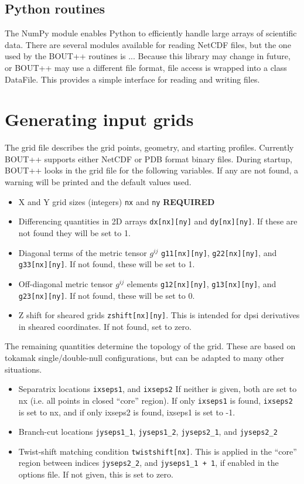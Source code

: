 \documentclass[12pt]{article}
\newcommand{\code}[1]{\texttt{#1}}
\begin{document}
\subsection{Python routines}
The NumPy module enables Python to efficiently handle large arrays of 
scientific data. There are several modules available for reading
NetCDF files, but the one used by the BOUT++ routines is ...
Because this library may change in future, or BOUT++ may use a different
file format, file access is wrapped into a class DataFile. This
provides a simple interface for reading and writing files.

\section{Generating input grids}
\label{sec:gridgen}

The grid file describes the grid points, geometry, and starting profiles.
Currently BOUT++ supports either NetCDF or PDB format binary files.
During startup, BOUT++ looks in the grid file for the following variables.
If any are not found, a warning will be printed and the default values used.
\begin{itemize}
\item X and Y grid sizes (integers) \code{nx} and \code{ny} {\bf REQUIRED}
\item Differencing quantities in 2D arrays \code{dx[nx][ny]} and \code{dy[nx][ny]}.
  If these are not found they will be set to 1.
\item Diagonal terms of the metric tensor $g^{ij}$ \code{g11[nx][ny]}, \code{g22[nx][ny]},
  and \code{g33[nx][ny]}. If not found, these will be set to 1. 
\item Off-diagonal metric tensor $g^{ij}$ elements \code{g12[nx][ny]}, \code{g13[nx][ny]},
  and \code{g23[nx][ny]}. If not found, these will be set to 0.
\item Z shift for sheared grids \code{zshift[nx][ny]}. This is intended for dpsi derivatives
  in sheared coordinates. If not found, set to zero.
\end{itemize}
The remaining quantities determine the topology of the grid. These are based on tokamak
single/double-null configurations, but can be adapted to many other situations.
\begin{itemize}
\item Separatrix locations \code{ixseps1}, and \code{ixseps2} If neither is given, both
  are set to nx (i.e. all points in closed ``core'' region). If only \code{ixseps1} is found,
  \code{ixseps2} is set to nx, and if only ixseps2 is found, ixseps1 is set to -1.
\item Branch-cut locations \code{jyseps1\_1}, \code{jyseps1\_2}, \code{jyseps2\_1}, and
  \code{jyseps2\_2}
\item Twist-shift matching condition \code{twistshift[nx]}. This is applied in the ``core''
  region between indices \code{jyseps2\_2}, and \code{jyseps1\_1 + 1}, if enabled in the options
  file. If not given, this is set to zero.
\end{itemize} 
\end{document}
